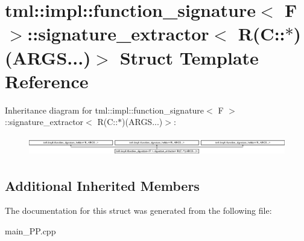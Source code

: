 \hypertarget{structtml_1_1impl_1_1function__signature_1_1signature__extractor_3_01R_07C_1_1_5_08_07ARGS_8_8_8_08_4}{\section{tml\+:\+:impl\+:\+:function\+\_\+signature$<$ F $>$\+:\+:signature\+\_\+extractor$<$ R(C\+:\+:$\ast$)(A\+R\+G\+S...)$>$ Struct Template Reference}
\label{structtml_1_1impl_1_1function__signature_1_1signature__extractor_3_01R_07C_1_1_5_08_07ARGS_8_8_8_08_4}
}
Inheritance diagram for tml\+:\+:impl\+:\+:function\+\_\+signature$<$ F $>$\+:\+:signature\+\_\+extractor$<$ R(C\+:\+:$\ast$)(A\+R\+G\+S...)$>$\+:\begin{figure}[H]
\begin{center}
\leavevmode
\includegraphics[height=0.866203cm]{structtml_1_1impl_1_1function__signature_1_1signature__extractor_3_01R_07C_1_1_5_08_07ARGS_8_8_8_08_4}
\end{center}
\end{figure}
\subsection*{Additional Inherited Members}


The documentation for this struct was generated from the following file\+:\begin{DoxyCompactItemize}
\item 
main\+\_\+\+P\+P.\+cpp\end{DoxyCompactItemize}

